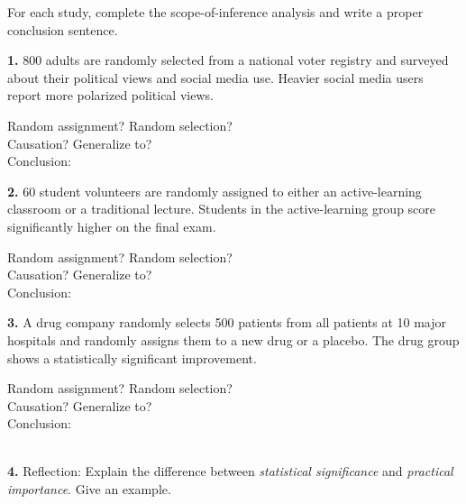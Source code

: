 \documentclass[10pt]{article}
\begin{document}
\namedateperiod

\vspace{0.1in}

\begin{practicebox}
\small
For each study, complete the scope-of-inference analysis and write a proper
conclusion sentence.

\vspace{8pt}
\textbf{1.} 800 adults are randomly selected from a national voter registry and
surveyed about their political views and social media use. Heavier social media users
report more polarized political views.

\vspace{4pt}
Random assignment? \blank{2cm} \quad Random selection? \blank{2cm}\\[4pt]
Causation? \blank{2cm} \quad Generalize to? \blank{7cm}\\[4pt]
Conclusion: \writeline\\[1pt]\writeline

\vspace{8pt}
\textbf{2.} 60 student volunteers are randomly assigned to either an active-learning
classroom or a traditional lecture. Students in the active-learning group score
significantly higher on the final exam.

\vspace{4pt}
Random assignment? \blank{2cm} \quad Random selection? \blank{2cm}\\[4pt]
Causation? \blank{2cm} \quad Generalize to? \blank{7cm}\\[4pt]
Conclusion: \writeline\\[1pt]\writeline

\vspace{8pt}
\textbf{3.} A drug company randomly selects 500 patients from all patients at 10 major
hospitals and randomly assigns them to a new drug or a placebo. The drug group shows
a statistically significant improvement.

\vspace{4pt}
Random assignment? \blank{2cm} \quad Random selection? \blank{2cm}\\[4pt]
Causation? \blank{2cm} \quad Generalize to? \blank{7cm}\\[4pt]
Conclusion: \writeline\\[1pt]\writeline\\[1pt]\writeline

\vspace{8pt}
\textbf{4.} Reflection: Explain the difference between \emph{statistical significance}
and \emph{practical importance}. Give an example.\\[4pt]
\writeline\\[1pt]\writeline\\[1pt]\writeline
\end{practicebox}
\end{document}
